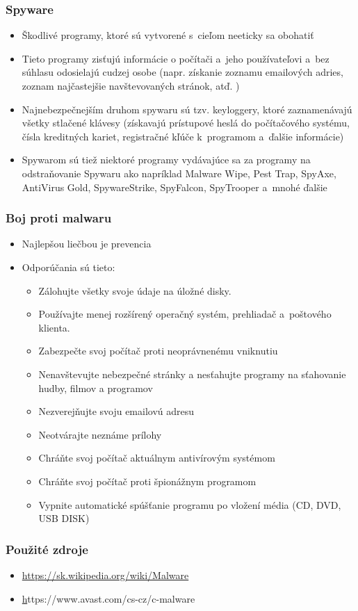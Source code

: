 \documentclass{beamer}
\begin{document}
\begin{frame}
\frametitle{Spyware}
\begin{itemize}
\item{Škodlivé programy, ktoré sú vytvorené s~cieľom neeticky sa obohatiť
}
\item{Tieto programy zisťujú informácie o počítači a~jeho používateľovi a~bez súhlasu odosielajú cudzej osobe (napr. získanie zoznamu emailových adries, zoznam najčastejšie navštevovaných stránok, atď. )
}
\item{Najnebezpečnejším druhom spywaru sú tzv. keyloggery, ktoré zaznamenávajú všetky stlačené klávesy (získavajú prístupové heslá do počítačového systému, čísla kreditných kariet, registračné kľúče k~programom a~ďalšie informácie)
}
\item{Spywarom sú tiež niektoré programy vydávajúce sa za programy na odstraňovanie Spywaru ako napríklad Malware Wipe, Pest Trap, SpyAxe, AntiVirus Gold, SpywareStrike, SpyFalcon, SpyTrooper a~mnohé ďalšie
}
\end{itemize}
\end{frame}

\begin{frame}
\frametitle{Boj proti malwaru}
\begin{itemize}
\item{Najlepšou liečbou je prevencia}
\item{Odporúčania sú tieto:}
\begin{itemize}
\item{Zálohujte všetky svoje údaje na úložné disky.}
\item{Používajte menej rozšírený operačný systém, prehliadač a~poštového klienta.}
\item{Zabezpečte svoj počítač proti neoprávnenému vniknutiu}
\item{Nenavštevujte nebezpečné stránky a nesťahujte programy na sťahovanie hudby, filmov a programov}
\item{Nezverejňujte svoju emailovú adresu}
\item{Neotvárajte neznáme prílohy}
\item{Chráňte svoj počítač aktuálnym antivírovým systémom}
\item{Chráňte svoj počítač proti špionážnym programom}
\item{Vypnite automatické spúšťanie programu po vložení média (CD, DVD, USB DISK)}
\end{itemize}
\end{itemize}
\end{frame}
\begin{frame}
\frametitle{Použité zdroje}
\begin{itemize}
\item{\href{https://sk.wikipedia.org/wiki/Malware}{https://sk.wikipedia.org/wiki/Malware}}
\item{\href{https://www.avast.com/cs-cz/c-malware}https://www.avast.com/cs-cz/c-malware}
\end{itemize}
\end{frame}
\end{document}
